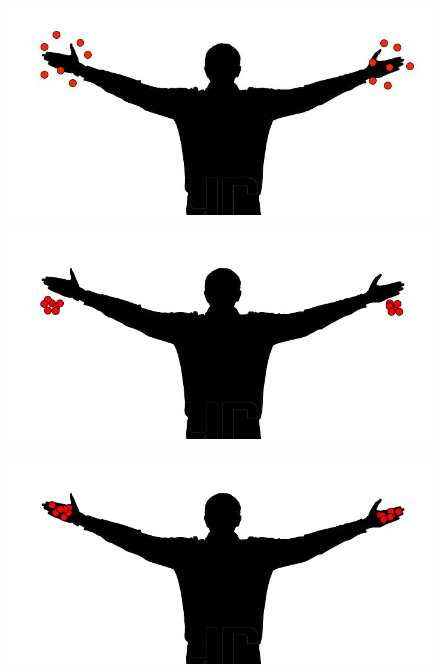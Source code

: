 \begin{figure}[htb]
	\centering
	\begin{minipage}[t]{0.49\linewidth}
		\centering
		\includegraphics[width=1\linewidth]{Pictures/systemInaccurateImprecise}
		\label{fig:systemInaccurateImprecise}
	\end{minipage}
	\hfill
	\begin{minipage}[t]{0.49\linewidth}
		\centering
		\includegraphics[width=1\linewidth]{Pictures/systemInaccuratePrecise}
		\label{fig:systemInaccuratePrecise}
	\end{minipage}
	\hfill
	\begin{minipage}[t]{0.49\linewidth}
		\centering
		\includegraphics[width=1\linewidth]{Pictures/systemAccuratePrecise}

\end{minipage}
\end{figure}
